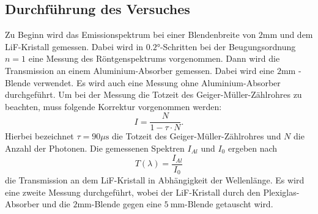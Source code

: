 \subsection{Durchführung des Versuches}
Zu Beginn wird das Emissionspektrum bei einer Blendenbreite von $2 \si{\milli\meter}$ und dem LiF-Kristall gemessen. Dabei wird in $0.2 \si{\degree}$-Schritten bei der Beugungsordnung $n = 1$ eine Messung des
Röntgenspektrums vorgenommen. Dann wird die Transmission an einem Aluminium-Absorber gemessen. Dabei wird eine $2 \si{\milli\meter}$ -Blende verwendet. Es wird auch eine Messung ohne Aluminium-Absorber
durchgeführt.
Um bei der Messung die Totzeit des Geiger-Müller-Zählrohres zu beachten, muss folgende Korrektur vorgenommen werden:
\begin{equation*}
	I = \frac{N}{1 - \tau \cdot N}.
\end{equation*}
Hierbei bezeichnet $\tau = 90 \mu \si{\second}$ die Totzeit des Geiger-Müller-Zählrohres und $N$ die Anzahl der Photonen.
Die gemessenen Spektren $I_{Al}$ und $I_0$ ergeben nach
\begin{equation}
	T(\lambda) = \frac{I_{Al}}{I_0}
	\label{eqn:trans}
\end{equation}
die Transmission an dem LiF-Kristall in Abhängigkeit der Wellenlänge.
Es wird eine zweite Messung durchgeführt, wobei der LiF-Kristall durch den Plexiglas-Absorber und die $2 \si{\milli\meter}$-Blende gegen eine $\SI{5}{\milli\meter}$-Blende getauscht wird.
